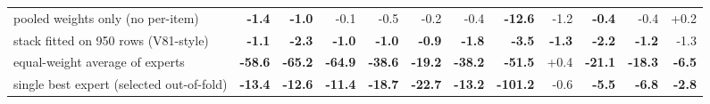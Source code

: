 \begin{table}[t]
\begin{tabular}{lrrrrrrrrrrr}
pooled weights only (no per-item) & \textbf{-1.4} & \textbf{-1.0} & -0.1 & -0.5 & -0.2 & -0.4 & \textbf{-12.6} & -1.2 & \textbf{-0.4} & -0.4 & +0.2 \\
stack fitted on 950 rows (V81-style) & \textbf{-1.1} & \textbf{-2.3} & \textbf{-1.0} & \textbf{-1.0} & \textbf{-0.9} & \textbf{-1.8} & \textbf{-3.5} & \textbf{-1.3} & \textbf{-2.2} & \textbf{-1.2} & -1.3 \\
equal-weight average of experts & \textbf{-58.6} & \textbf{-65.2} & \textbf{-64.9} & \textbf{-38.6} & \textbf{-19.2} & \textbf{-38.2} & \textbf{-51.5} & +0.4 & \textbf{-21.1} & \textbf{-18.3} & \textbf{-6.5} \\
single best expert (selected out-of-fold) & \textbf{-13.4} & \textbf{-12.6} & \textbf{-11.4} & \textbf{-18.7} & \textbf{-22.7} & \textbf{-13.2} & \textbf{-101.2} & -0.6 & \textbf{-5.5} & \textbf{-6.8} & \textbf{-2.8} \\
\bottomrule
\end{tabular}
\end{table}
